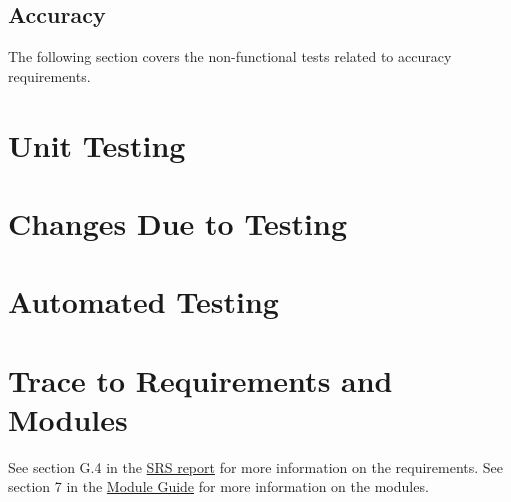 \documentclass[12pt, titlepage]{article}
\begin{document}
\subsection{Accuracy}
The following section covers the non-functional tests related to accuracy requirements.

\section{Unit Testing}

\section{Changes Due to Testing}


\section{Automated Testing}
		
\section{Trace to Requirements and Modules}		
See section G.4 in the \href{https://github.com/takhtart/PCD/blob/main/docs/SRS/SRS.pdf}{SRS report} for more information on the requirements. See section 7 in the \href{https://github.com/takhtart/PCD/blob/main/docs/Design/SoftArchitecture/MG.pdf}{Module Guide} for more information on the modules.
\end{document}
